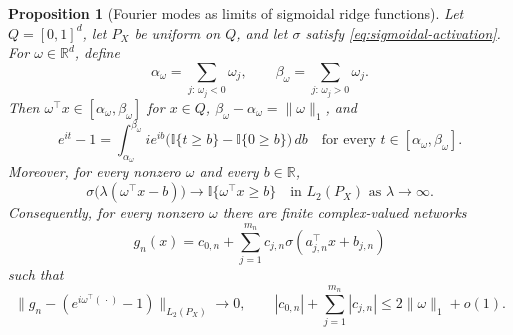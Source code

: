 \documentclass[11pt,twoside]{article}
\newcommand{\I}{\mathbb I}
\newcommand{\R}{\mathbb R}
\newtheorem{proposition}[theorem]{Proposition}
\theoremstyle{definition}
\theoremstyle{remark}
\begin{document}
\begin{proposition}[Fourier modes as limits of sigmoidal ridge functions]
\label{prop:fourier-to-ridge}
Let $Q=[0,1]^d$, let $P_X$ be uniform on $Q$, and let $\sigma$ satisfy
\cref{eq:sigmoidal-activation}. For $\omega\in\R^d$, define
\begin{equation}
 \alpha_\omega=\sum_{j:\,\omega_j<0}\omega_j,
 \qquad
 \beta_\omega=\sum_{j:\,\omega_j>0}\omega_j.
 \label{eq:fourier-mode-range}
\end{equation}
Then $\omega^\top x\in[\alpha_\omega,\beta_\omega]$ for $x\in Q$,
$\beta_\omega-\alpha_\omega=\|\omega\|_1$, and
\begin{equation}
 e^{it}-1
 =\int_{\alpha_\omega}^{\beta_\omega}
 ie^{ib}\bigl(\I\{t\geq b\}-\I\{0\geq b\}\bigr)\,db
 \quad\text{for every $t\in[\alpha_\omega,\beta_\omega]$.}
 \label{eq:fourier-mode-threshold-identity}
\end{equation}
Moreover, for every nonzero $\omega$ and every $b\in\R$,
\begin{equation}
 \sigma\bigl(\lambda(\omega^\top x-b)\bigr)
 \longrightarrow \I\{\omega^\top x\geq b\}
 \quad\text{in $L_2(P_X)$ as $\lambda\to\infty$.}
 \label{eq:sigmoid-to-threshold}
\end{equation}
Consequently, for every nonzero $\omega$ there are finite complex-valued
networks
\begin{equation}
 g_n(x)=c_{0,n}+\sum_{j=1}^{m_n}
 c_{j,n}\sigma(a_{j,n}^\top x+b_{j,n})
 \label{eq:finite-complex-sigmoid-networks}
\end{equation}
such that
\begin{equation}
 \|g_n-(e^{i\omega^\top(\,\cdot)}-1)\|_{L_2(P_X)}\longrightarrow0,
 \qquad
 |c_{0,n}|+\sum_{j=1}^{m_n}|c_{j,n}|
 \leq2\|\omega\|_1+o(1).
 \label{eq:fourier-mode-network-limit}
\end{equation}
\end{proposition}
\end{document}
